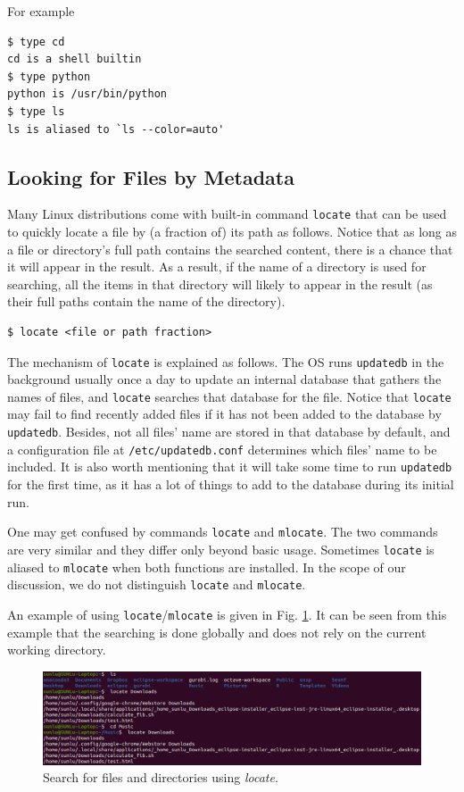 For example
\begin{lstlisting}
$ type cd
cd is a shell builtin
$ type python
python is /usr/bin/python
$ type ls
ls is aliased to `ls --color=auto'
\end{lstlisting}

\subsection{Looking for Files by Metadata}

Many Linux distributions come with built-in command \verb|locate| that can be used to quickly locate a file by (a fraction of) its path as follows. Notice that as long as a file or directory's full path contains the searched content, there is a chance that it will appear in the result. As a result, if the name of a directory is used for searching, all the items in that directory will likely to appear in the result (as their full paths contain the name of the directory).
\begin{lstlisting}
$ locate <file or path fraction>
\end{lstlisting}

The mechanism of \verb|locate| is explained as follows. The OS runs \verb|updatedb| in the background usually once a day to update an internal database that gathers the names of files, and \verb|locate| searches that database for the file. Notice that \verb|locate| may fail to find recently added files if it has not been added to the database by \verb|updatedb|. Besides, not all files' name are stored in that database by default, and a configuration file at \verb|/etc/updatedb.conf| determines which files' name to be included. It is also worth mentioning that it will take some time to run \verb|updatedb| for the first time, as it has a lot of things to add to the database during its initial run.

One may get confused by commands \verb|locate| and \verb|mlocate|. The two commands are very similar and they differ only beyond basic usage. Sometimes \verb|locate| is aliased to \verb|mlocate| when both functions are installed. In the scope of our discussion, we do not distinguish \verb|locate| and \verb|mlocate|.

An example of using \verb|locate|/\verb|mlocate| is given in Fig. \ref{ch:fm:fig:locateexp}. It can be seen from this example that the searching is done globally and does not rely on the current working directory.
\begin{figure}[htbp]
	\centering
	\includegraphics[width=350pt]{chapters/part-1/figures/locateexp.png}
	\caption{Search for files and directories using \textit{locate}.} \label{ch:fm:fig:locateexp}
\end{figure}

